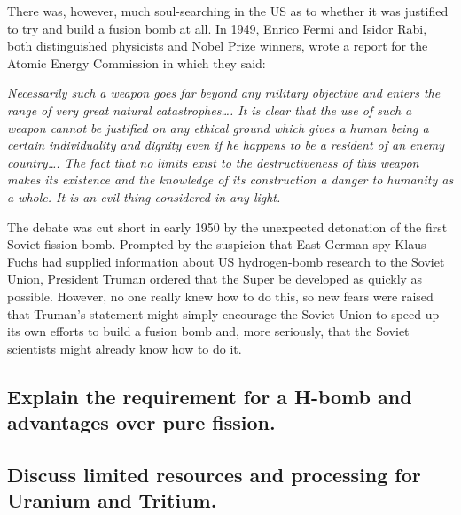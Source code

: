 \begin{multisolutionblock}
There was, however, much soul-searching in the US as to whether it was
justified to try and build a fusion bomb at all. In 1949, Enrico Fermi and Isidor Rabi, both distinguished physicists and Nobel Prize winners, wrote a report for the Atomic Energy Commission in which they said:

\textit{Necessarily such a weapon goes far beyond any military objective and enters the range of very great natural catastrophes…. It is clear that the use of such a weapon cannot
be justified on any ethical ground which gives a human being a certain individuality and dignity even if he happens to be a resident of an enemy country…. The fact that no limits exist to the destructiveness of this weapon makes its existence and the knowledge of its construction a danger to humanity as a whole. It is an evil thing considered in any light.}
\newpage

The debate was cut short in early 1950 by the unexpected detonation of
the first Soviet fission bomb. Prompted by the suspicion that East German spy Klaus Fuchs had supplied information about US hydrogen-bomb research to the Soviet Union, President Truman ordered that the Super be developed as quickly as possible. However, no one really knew how to do this, so new fears were raised that Truman’s statement might simply encourage the Soviet Union to speed up its own efforts to build a fusion bomb and, more seriously, that the Soviet scientists might already know how to do it.
\end{multisolutionblock}

\subsection{Explain the requirement for a H-bomb and advantages over pure fission.}

\subsection{Discuss limited resources and processing for Uranium and Tritium.}

